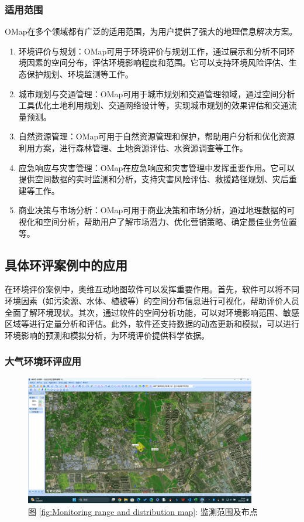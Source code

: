 \documentclass{cdut_thesis_twoside}
\begin{document}
\subsubsection{适用范围}
OMap在多个领域都有广泛的适用范围，为用户提供了强大的地理信息解决方案。
\begin{enumerate}
    \item 环境评价与规划：OMap可用于环境评价与规划工作，通过展示和分析不同环境因素的空间分布，评估环境影响程度和范围。它可以支持环境风险评估、生态保护规划、环境监测等工作。
    \item 城市规划与交通管理：OMap可用于城市规划和交通管理领域，通过空间分析工具优化土地利用规划、交通网络设计等，实现城市规划的效果评估和交通流量预测。
    \item 自然资源管理：OMap可用于自然资源管理和保护，帮助用户分析和优化资源利用方案，进行森林管理、土地资源评估、水资源调查等工作。
    \item 应急响应与灾害管理：OMap在应急响应和灾害管理中发挥重要作用。它可以提供空间数据的实时监测和分析，支持灾害风险评估、救援路径规划、灾后重建等工作。
    \item 商业决策与市场分析：OMap可用于商业决策和市场分析，通过地理数据的可视化和空间分析，帮助用户了解市场潜力、优化营销策略、确定最佳业务位置等。
\end{enumerate}


\subsection{具体环评案例中的应用}
在环境评价案例中，奥维互动地图软件可以发挥重要作用。首先，软件可以将不同环境因素（如污染源、水体、植被等）的空间分布信息进行可视化，帮助评价人员全面了解环境现状。其次，通过软件的空间分析功能，可以对环境影响范围、敏感区域等进行定量分析和评估。此外，软件还支持数据的动态更新和模拟，可以进行环境影响的预测和模拟分析，为环境评价提供科学依据。


\subsubsection{大气环境环评应用}

\begin{figure}[H]
    \centering
    \includegraphics[width=0.9\textwidth]{figures/Monitoring range and distribution map.png}
    \caption*{图 \ref{fig:Monitoring range and distribution map}: 监测范围及布点}
\end{figure}
\end{document}
